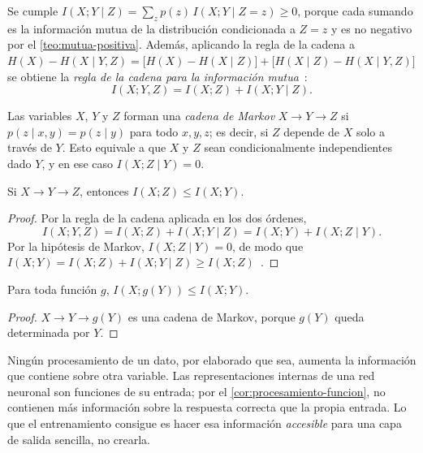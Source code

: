 Se cumple $I(X;Y\mid Z)=\sum_z p(z)\,I(X;Y\mid Z=z)\ge 0$, porque cada sumando es la información mutua de la distribución condicionada a $Z=z$ y es no negativo por el \cref{teo:mutua-positiva}. Además, aplicando la regla de la cadena a $H(X)-H(X\mid Y,Z)=\bigl[H(X)-H(X\mid Z)\bigr]+\bigl[H(X\mid Z)-H(X\mid Y,Z)\bigr]$ se obtiene la \emph{regla de la cadena para la información mutua}~\cite[§2.5]{ct}:
\[
I(X;Y,Z)=I(X;Z)+I(X;Y\mid Z).
\]

\begin{definicion}
Las variables $X$, $Y$ y $Z$ forman una \emph{cadena de Markov} $X\to Y\to Z$ si $p(z\mid x,y)=p(z\mid y)$ para todo $x,y,z$; es decir, si $Z$ depende de $X$ solo a través de $Y$. Esto equivale a que $X$ y $Z$ sean condicionalmente independientes dado $Y$, y en ese caso $I(X;Z\mid Y)=0$.
\end{definicion}

\begin{teorema}\label{teo:procesamiento}
Si $X\to Y\to Z$, entonces $I(X;Z)\le I(X;Y)$.
\end{teorema}

\begin{proof}
Por la regla de la cadena aplicada en los dos órdenes,
\[
I(X;Y,Z)=I(X;Z)+I(X;Y\mid Z)=I(X;Y)+I(X;Z\mid Y).
\]
Por la hipótesis de Markov, $I(X;Z\mid Y)=0$, de modo que $I(X;Y)=I(X;Z)+I(X;Y\mid Z)\ge I(X;Z)$~\cite[§2.8]{ct}.
\end{proof}

\begin{corolario}\label{cor:procesamiento-funcion}
Para toda función $g$, $I(X;g(Y))\le I(X;Y)$.
\end{corolario}

\begin{proof}
$X\to Y\to g(Y)$ es una cadena de Markov, porque $g(Y)$ queda determinada por $Y$.
\end{proof}

\begin{observacion}
Ningún procesamiento de un dato, por elaborado que sea, aumenta la información que contiene sobre otra variable. Las representaciones internas de una red neuronal son funciones de su entrada; por el \cref{cor:procesamiento-funcion}, no contienen más información sobre la respuesta correcta que la propia entrada. Lo que el entrenamiento consigue es hacer esa información \emph{accesible} para una capa de salida sencilla, no crearla.
\end{observacion}

